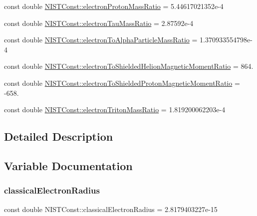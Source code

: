 \begin{DoxyCompactItemize}
\item 
const double \hyperlink{group___n_i_s_t_const-_electron_gabbaa23094e18f2b83e6145adaebbb6e7}{N\+I\+S\+T\+Const\+::electron\+Proton\+Mass\+Ratio} = 5.\+44617021352e-\/4
\item 
const double \hyperlink{group___n_i_s_t_const-_electron_ga513e30853388cdd091c192dfb6371fa8}{N\+I\+S\+T\+Const\+::electron\+Tau\+Mass\+Ratio} = 2.\+87592e-\/4
\item 
const double \hyperlink{group___n_i_s_t_const-_electron_ga1090a3f764cafde391a3dfe7f459a94d}{N\+I\+S\+T\+Const\+::electron\+To\+Alpha\+Particle\+Mass\+Ratio} = 1.\+370933554798e-\/4
\item 
const double \hyperlink{group___n_i_s_t_const-_electron_gaff98723ab3ee4e1be57a04f2a0f6034d}{N\+I\+S\+T\+Const\+::electron\+To\+Shielded\+Helion\+Magnetic\+Moment\+Ratio} = 864.
\item 
const double \hyperlink{group___n_i_s_t_const-_electron_gacf35e7562c94178f6b182cff46131b6d}{N\+I\+S\+T\+Const\+::electron\+To\+Shielded\+Proton\+Magnetic\+Moment\+Ratio} = -\/658.
\item 
const double \hyperlink{group___n_i_s_t_const-_electron_gac9bfee1055b6fd5d3dabb3126318b52e}{N\+I\+S\+T\+Const\+::electron\+Triton\+Mass\+Ratio} = 1.\+819200062203e-\/4
\end{DoxyCompactItemize}


\subsection{Detailed Description}


\subsection{Variable Documentation}
\mbox{\label{group___n_i_s_t_const-_electron_gac67d6a01d8d75cb66290a36f7123942b}} 
\subsubsection{\texorpdfstring{classical\+Electron\+Radius}{classicalElectronRadius}}
{\footnotesize\ttfamily const double N\+I\+S\+T\+Const\+::classical\+Electron\+Radius = 2.\+8179403227e-\/15}

